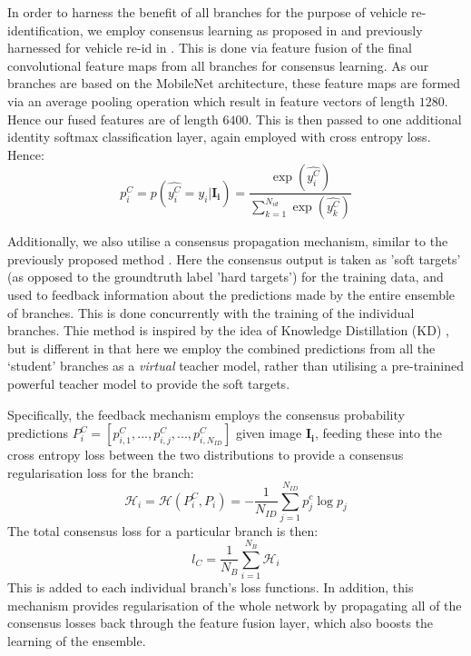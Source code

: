\documentclass[10pt,twocolumn,letterpaper]{article}
\begin{document}
In order to harness the benefit of all branches for the purpose of vehicle re-identification, we employ consensus learning as proposed in \cite{chen2017person} and previously harnessed for vehicle re-id in \cite{kanaci2018vehicle}. This is done via feature fusion of the final convolutional feature maps from all branches for consensus learning. As our branches are based on the MobileNet architecture, these feature maps are formed via an average pooling operation which result in feature vectors of length $1280$. Hence our fused features are of length $6400$. This is then passed to one additional identity softmax classification layer, again employed with cross entropy loss. Hence:
\begin{equation}
  p_i^C = p(\hat{y_i^C} = y_i|\mathbf{I_i}) = \frac{\exp(\hat{y_i^C})}{\sum_{k=1}^{N_{id}}\exp(\hat{y_k^C})}
\end{equation}

Additionally, we also utilise a consensus propagation mechanism, similar to the previously proposed method \cite{chen2017person,kanaci2018vehicle}. Here the consensus output is taken as 'soft targets' (as opposed to the groundtruth label 'hard targets') for the training data, and used to feedback information about the predictions made by the entire ensemble of branches. This is done concurrently with the training of the individual branches. Thie method is inspired by the idea of Knowledge Distillation (KD) \cite{hinton2015distilling}, but is different in that here we employ the combined predictions from all the `student' branches as a \emph{virtual} teacher model, rather than utilising a pre-trainined powerful teacher model to provide the soft targets.

Specifically, the feedback mechanism employs the consensus probability predictions $P^C_i = \left[p_{i,1}^C,...,p_{i,j}^C,...,p_{i,N_{ID}}^C\right]$ given image $\mathbf{I_i}$, feeding these into the cross entropy loss between the two distributions to provide a consensus regularisation loss for the branch:
\begin{equation}
  \mathcal{H}_i = \mathcal{H}(P^C_i, P_i) = -\frac{1}{N_{ID}}\sum_{j=1}^{N_{ID}} p_j^c \log{p_j}
\end{equation}
The total consensus loss for a particular branch is then:
\begin{equation}
  l_{C} = \frac{1}{N_B} \sum_{i=1}^{N_B} \mathcal{H}_i
\end{equation}
This is added to each individual branch's loss functions. In addition, this mechanism provides regularisation of the whole network by propagating all of the consensus losses back through the feature fusion layer, which also boosts the learning of the ensemble.
\end{document}
